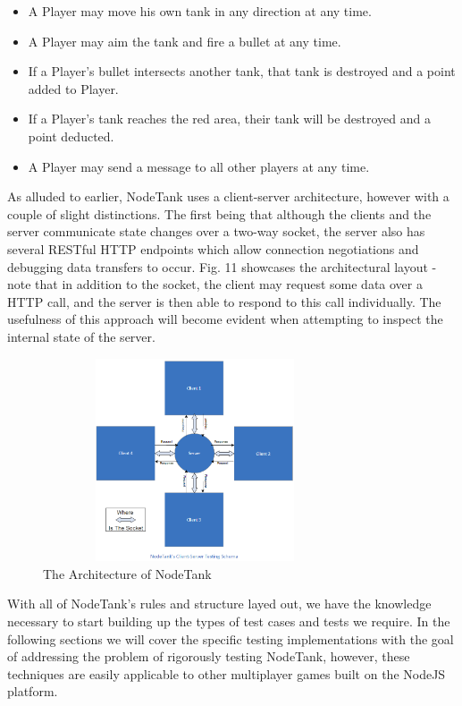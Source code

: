 \documentclass[conference]{IEEEtran}
\begin{document}
\begin{itemize}
  \item A Player may move his own tank in any direction at any time.
  \item A Player may aim the tank and fire a bullet at any time.
  \item If a Player's bullet intersects another tank, that tank is destroyed and a point added to Player.
  \item If a Player's tank reaches the red area, their tank will be destroyed and a point deducted.
  \item A Player may send a message to all other players at any time.
\end{itemize}

As alluded to earlier, NodeTank uses a client-server architecture, however with a couple of slight distinctions. The first being that although the clients and the server
communicate state changes over a two-way socket, the server also has several RESTful HTTP endpoints which allow connection negotiations and debugging data transfers to occur. 
Fig. 11 showcases the architectural layout - note that in addition to the socket, the client may request some data over a HTTP call, and the server is then able to respond to 
this call individually. The usefulness of this approach will become evident when attempting to inspect the internal state of the server. 

\begin{figure}[htbp]
\centerline{\includegraphics [width = 9cm, height = 6cm] {images/testingSchemaArch.png}}
\caption{The Architecture of NodeTank}
\end{figure}


With all of NodeTank's rules and structure layed out, we have the knowledge necessary to start building up the types of test cases and tests we require. 
In the following sections we will cover the specific testing implementations with the goal of addressing the problem of rigorously testing NodeTank, however, these techniques 
are easily applicable to other multiplayer games built on the NodeJS platform. 
\end{document}

